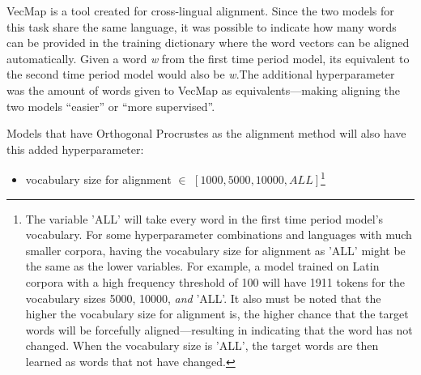VecMap is a tool created for cross-lingual alignment. Since the two models for this task share the same language, it was possible to indicate how many words can be provided in the training dictionary where the word vectors can be aligned automatically. Given a word \emph{w} from the first time period model, its equivalent to the second time period model would also be \emph{w}.The additional hyperparameter was the amount of words given to VecMap as equivalents—making aligning the two models “easier” or “more supervised”.


Models that have Orthogonal Procrustes as the alignment method will also have this added hyperparameter:
\begin{itemize}
    \item vocabulary size for alignment $\in$ $[1000, 5000, 10000, ALL]$\footnote{The variable 'ALL' will take every word in the first time period model's vocabulary. For some hyperparameter combinations and languages with much smaller corpora, having the vocabulary size for alignment as 'ALL' might be the same as the lower variables. For example, a model trained on Latin corpora with a high frequency threshold of 100 will have 1911 tokens for the vocabulary sizes 5000, 10000, \emph{and} 'ALL'. It also must be noted that the higher the vocabulary size for alignment is, the higher chance that the target words will be forcefully aligned—resulting in indicating that the word has not changed. When the vocabulary size is 'ALL', the target words are then learned as words that not have changed.} 
\end{itemize}%


